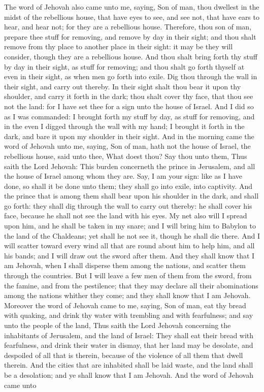 The word of Jehovah also came unto me, saying, Son of man, thou dwellest in the midst of the rebellious house, that have eyes to see, and see not, that have ears to hear, and hear not; for they are a rebellious house. Therefore, thou son of man, prepare thee stuff for removing, and remove by day in their sight; and thou shalt remove from thy place to another place in their sight: it may be they will consider, though they are a rebellious house. And thou shalt bring forth thy stuff by day in their sight, as stuff for removing; and thou shalt go forth thyself at even in their sight, as when men go forth into exile. Dig thou through the wall in their sight, and carry out thereby. In their sight shalt thou bear it upon thy shoulder, and carry it forth in the dark; thou shalt cover thy face, that thou see not the land: for I have set thee for a sign unto the house of Israel.  And I did so as I was commanded: I brought forth my stuff by day, as stuff for removing, and in the even I digged through the wall with my hand; I brought it forth in the dark, and bare it upon my shoulder in their sight.  And in the morning came the word of Jehovah unto me, saying, Son of man, hath not the house of Israel, the rebellious house, said unto thee, What doest thou? Say thou unto them, Thus saith the Lord Jehovah: This burden concerneth the prince in Jerusalem, and all the house of Israel among whom they are. Say, I am your sign: like as I have done, so shall it be done unto them; they shall go into exile, into captivity. And the prince that is among them shall bear upon his shoulder in the dark, and shall go forth: they shall dig through the wall to carry out thereby: he shall cover his face, because he shall not see the land with his eyes. My net also will I spread upon him, and he shall be taken in my snare; and I will bring him to Babylon to the land of the Chaldeans; yet shall he not see it, though he shall die there. And I will scatter toward every wind all that are round about him to help him, and all his bands; and I will draw out the sword after them. And they shall know that I am Jehovah, when I shall disperse them among the nations, and scatter them through the countries. But I will leave a few men of them from the sword, from the famine, and from the pestilence; that they may declare all their abominations among the nations whither they come; and they shall know that I am Jehovah.  Moreover the word of Jehovah came to me, saying, Son of man, eat thy bread with quaking, and drink thy water with trembling and with fearfulness; and say unto the people of the land, Thus saith the Lord Jehovah concerning the inhabitants of Jerusalem, and the land of Israel: They shall eat their bread with fearfulness, and drink their water in dismay, that her land may be desolate, and despoiled of all that is therein, because of the violence of all them that dwell therein. And the cities that are inhabited shall be laid waste, and the land shall be a desolation; and ye shall know that I am Jehovah.  And the word of Jehovah came unto 